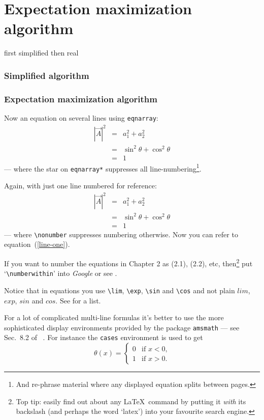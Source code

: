 \section{Expectation maximization algorithm}
first simplified then real
\subsubsection{Simplified algorithm}
\subsubsection{Expectation maximization algorithm}
Now an equation on several lines using \verb+eqnarray+:
\begin{eqnarray*}
  |\vec A|^2 &=& a_1^2+a_2^2  \\
             &=& \sin^2\theta+\cos^2\theta \\
             &=& 1
\end{eqnarray*}--- where the star on \verb+eqnarray*+ suppresses
all line-numbering\footnote{And re-phrase material where any displayed
equation splits between pages.}.
\par
Again, with just one line numbered for reference:
\begin{eqnarray}
  |\vec A|^2 &=& a_1^2+a_2^2  \label{line-one}\\
             &=& \sin^2\theta+\cos^2\theta \nonumber \\
             &=& 1  \nonumber
\end{eqnarray}--- where \verb+\nonumber+ suppresses numbering
otherwise. Now you can refer to equation~(\ref{line-one}).
\par
If you want to number the equations in Chapter 2 as (2.1), (2.2), etc,
then\footnote{Top tip: easily find out about any \LaTeX\ command by
putting it \textit{with} its backslash (and perhaps the word \lq latex')
into your favourite search engine.} put \lq\verb+\numberwithin+' into
\textsl{Google} or see \cite[Sec 8.2.14]{MG}.
\par
Notice that in equations you use \verb+\lim+, \verb+\exp+, \verb+\sin+
and \verb+\cos+ and not plain $lim$, $exp$, $sin$ and $cos$. See
\cite[Sec.~3.3]{NSS} for a list.
\par
For a lot of complicated multi-line formulas it's better to use the more
sophisticated display environments provided by the package
\texttt{amsmath} --- see Sec.~8.2 of \comp\ \cite{MG}.
For instance the \texttt{cases} environment is used to get
\[\theta(x)=\begin{cases}0&\text{if $x<0$,}\\
		1&\text{if $x>0$.}\end{cases}\]
